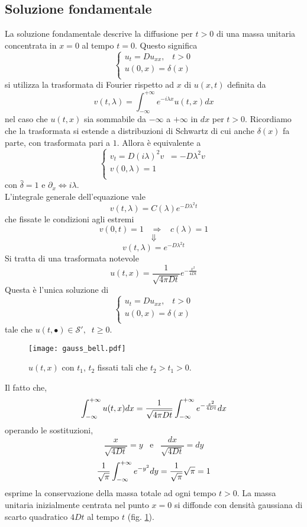 \subsection{Soluzione fondamentale}
La soluzione fondamentale descrive la diffusione per $t>0$ di una massa unitaria
concentrata in $x=0$ al tempo $t=0$. Questo significa
\[
	\left\{
	\begin{array}{l}
		u_t=Du_{xx}, \;\;\; t>0 \\
		u(0,x)= \delta(x)  \\
	\end{array}
	\right.
\]
si utilizza la trasformata di Fourier rispetto ad $x$ di $u(x,t)$ definita da
\[
	v(t,\lambda)=\int_{-\infty}^{+\infty} e^{-i\lambda x} u(t,x) dx
\]
nel caso che $u(t,x)$ sia sommabile da $- \infty$ a $+ \infty$ in $dx$ per
$t>0$. Ricordiamo che la trasformata si estende a distribuzioni di Schwartz
di cui anche $\delta (x)$ fa parte, con trasformata pari a $1$.
Allora \`e equivalente a
\[
	\left\{
	\begin{array}{l}
		v_t=D\left( i\lambda \right)^2 v \;\; = -D\lambda^2 v\\
		v(0,\lambda)= 1  \\
	\end{array}
	\right.
\]
con $\hat{\delta}= 1$ e $\partial_x \Leftrightarrow i\lambda$.\\
L'integrale generale dell'equazione vale
\[
	v(t,\lambda)= C(\lambda)e^{-D\lambda^2 t}
\]
che fissate le condizioni agli estremi
\[
	v(0,t)= 1 \;\;\; \Rightarrow \;\;\; c(\lambda)= 1
\]
\[
	\Downarrow
\]
\[
	v(t,\lambda)= e^{-D\lambda^2 t}
\]
Si tratta di una trasformata notevole
\[
	u(t,x)= \frac{1}{\sqrt{4 \pi D t}}
	e^{-\frac{x^2}{4Dt}}
\]
Questa \`e l'unica soluzione di
\[
	\left\{
	\begin{array}{l}
		u_t=Du_{xx}, \;\;\; t>0 \\
		u(0,x)= \delta(x)  \\
	\end{array}
	\right.
\]
tale che $u(t, \bullet) \in \mathcal{S'}, \;\; t \geq 0$.
\begin{figure}[H]
	\centering
	\texttt{[image: gauss\_bell.pdf]}
	\caption{$u(t,x)$ con $t_1$, $t_2$ fissati tali che $t_2>t_1>0$.}
	\label{gauss_bell}
\end{figure}
Il fatto che,
\[
	\int_{- \infty}^{+ \infty} u(t,x) dx =
	\frac{1}{\sqrt{4 \pi D t}}
	\int_{- \infty}^{+ \infty} e^{-\frac{x^2}{4Dt}} dx
\]
operando le sostituzioni,
\[
\frac{x}{\sqrt{4Dt}}= y \;\;\; \text{e} \;\;\; \frac{dx}{\sqrt{4Dt}}= dy
\]
\[
	\frac{1}{\sqrt{\pi}}\int_{- \infty}^{+ \infty} e^{-y^2} dy= \frac{1}{\sqrt{\pi}}\sqrt{\pi}=1
\]
esprime la conservazione della massa totale ad ogni tempo $t>0$.
La massa unitaria inizialmente centrata nel punto $x=0$ si diffonde con
densit\`a gaussiana di scarto quadratico $4Dt$ al tempo $t$ (fig.
\ref{gauss_bell}).

